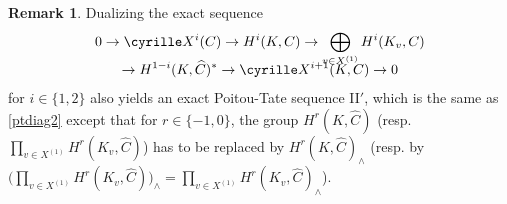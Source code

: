 \documentclass[11pt]{article}
\newcommand{\resp}{resp.\xspace}
\newcommand{\tprod}{{\textstyle\prod}}
\theoremstyle{plain}
\theoremstyle{definition}
\newtheorem{rema}[theo]{Remark}
\newcommand\Sha{\cyrille X}
\begin{document}
\begin{rema} \label{II'}
Dualizing the exact sequence
\begin{multline*}
0 \to \Sha^i(C) \to H^i(K,C) \to
\bigoplus_{v \in X^{(1)}} H^i(K_v,C)\\[-8pt]
\to H^{1-i}(K,\widehat C)^*
\to \Sha^{i+1}(K,C) \to 0
\end{multline*}
for $i \in \{1, 2\}$ also yields an exact Poitou-Tate sequence II$'$, which
is the same as \eqref{ptdiag2} except that for $r \in \{-1, 0\}$, the
group $H^r(K,\widehat C)$ (\resp $\tprod_{v \in X^{(1)}} H^r(K_v,\widehat C)$)
has to be replaced
by $H^r(K,\widehat C)_{\wedge}$ (\resp by $\bigl(\tprod_{v \in X^{(1)}} H^r(K_v,\widehat C)\bigr)_{\wedge}=
\tprod_{v \in X^{(1)}} H^r(K_v,\widehat C)_{\wedge}$).
\end{rema}
\end{document}

